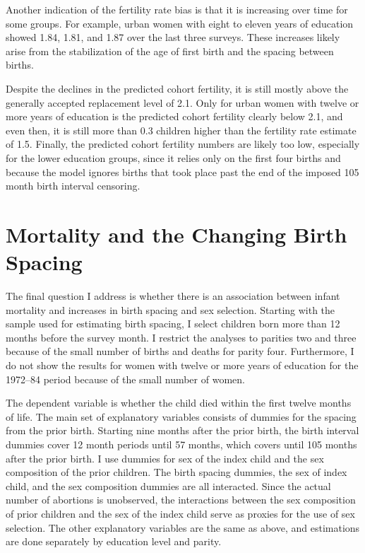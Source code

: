 \documentclass[12pt,letterpaper]{article}
\begin{document}
Another indication of the fertility rate bias is that it is increasing over time for some 
groups.
For example, urban women with eight to eleven years of education showed 1.84, 1.81, and
1.87 over the last three surveys.
These increases likely arise from the stabilization of the age of first birth and the 
spacing between births.

%

Despite the declines in the predicted cohort fertility, it is still mostly above the 
generally accepted replacement level of 2.1.
Only for urban women with twelve or more years of education is the predicted cohort
fertility clearly below 2.1, and even then, it is still more than 0.3 children higher than 
the fertility rate estimate of 1.5.
Finally, the predicted cohort fertility numbers are likely too low,
especially for the lower education groups, since it relies only on the
first four births and because the model ignores births that took place past the end
of the imposed 105 month birth interval censoring.


\section{Mortality and the Changing Birth Spacing\label{sec:mortality}}

The final question I address is whether there is an association between infant mortality 
and increases in birth spacing and sex selection. 
Starting with the sample used for estimating birth spacing, I select children born more 
than 12 months before the survey month. 
I restrict the analyses to parities two and three because of the small number of births 
and deaths for parity four. 
Furthermore, I do not show the results for women with twelve or more years of education 
for the 1972--84 period because of the small number of women.

The dependent variable is whether the child died within the first twelve
months of life.
The main set of explanatory variables consists of dummies for the spacing from
the prior birth.
Starting nine months after the prior birth, the birth interval dummies cover 12 
month periods until 57 months, which covers until 105 months after the prior birth.
I use dummies for sex of the index child and the sex composition 
of the prior children.
The birth spacing dummies, the sex of index child, and the sex composition dummies
are all interacted.
Since the actual number of abortions is unobserved, the interactions between
the sex composition of prior children and the sex of the index child serve
as proxies for the use of sex selection.
The other explanatory variables are the same as above, and estimations
are done separately by education level and parity.
\end{document}
